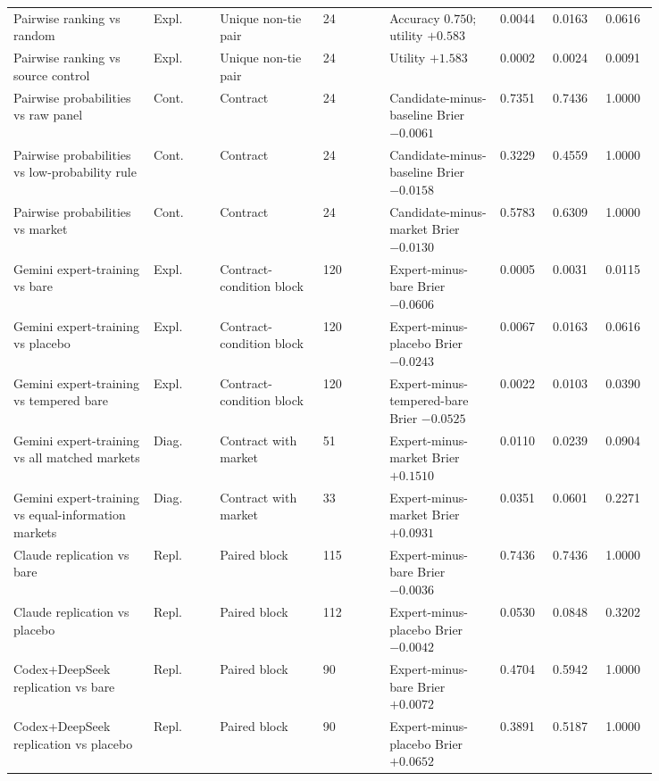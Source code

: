 \documentclass[11pt]{article}
\begin{document}
\begin{longtable}{@{}L{0.19\linewidth} L{0.09\linewidth} L{0.14\linewidth} L{0.09\linewidth} L{0.15\linewidth} L{0.06\linewidth} L{0.06\linewidth} L{0.06\linewidth}@{}}
Pairwise ranking vs random & Expl. & Unique non-tie pair & 24 & Accuracy \(0.750\); utility \(+0.583\) & 0.0044 & 0.0163 & 0.0616 \\
Pairwise ranking vs source control & Expl. & Unique non-tie pair & 24 & Utility \(+1.583\) & 0.0002 & 0.0024 & 0.0091 \\
Pairwise probabilities vs raw panel & Cont. & Contract & 24 & Candidate-minus-baseline Brier \(-0.0061\) & 0.7351 & 0.7436 & 1.0000 \\
Pairwise probabilities vs low-probability rule & Cont. & Contract & 24 & Candidate-minus-baseline Brier \(-0.0158\) & 0.3229 & 0.4559 & 1.0000 \\
Pairwise probabilities vs market & Cont. & Contract & 24 & Candidate-minus-market Brier \(-0.0130\) & 0.5783 & 0.6309 & 1.0000 \\
Gemini expert-training vs bare & Expl. & Contract-condition block & 120 & Expert-minus-bare Brier \(-0.0606\) & 0.0005 & 0.0031 & 0.0115 \\
Gemini expert-training vs placebo & Expl. & Contract-condition block & 120 & Expert-minus-placebo Brier \(-0.0243\) & 0.0067 & 0.0163 & 0.0616 \\
Gemini expert-training vs tempered bare & Expl. & Contract-condition block & 120 & Expert-minus-tempered-bare Brier \(-0.0525\) & 0.0022 & 0.0103 & 0.0390 \\
Gemini expert-training vs all matched markets & Diag. & Contract with market & 51 & Expert-minus-market Brier \(+0.1510\) & 0.0110 & 0.0239 & 0.0904 \\
Gemini expert-training vs equal-information markets & Diag. & Contract with market & 33 & Expert-minus-market Brier \(+0.0931\) & 0.0351 & 0.0601 & 0.2271 \\
Claude replication vs bare & Repl. & Paired block & 115 & Expert-minus-bare Brier \(-0.0036\) & 0.7436 & 0.7436 & 1.0000 \\
Claude replication vs placebo & Repl. & Paired block & 112 & Expert-minus-placebo Brier \(-0.0042\) & 0.0530 & 0.0848 & 0.3202 \\
Codex+DeepSeek replication vs bare & Repl. & Paired block & 90 & Expert-minus-bare Brier \(+0.0072\) & 0.4704 & 0.5942 & 1.0000 \\
Codex+DeepSeek replication vs placebo & Repl. & Paired block & 90 & Expert-minus-placebo Brier \(+0.0652\) & 0.3891 & 0.5187 & 1.0000 \\
\end{longtable}
\endgroup
\end{document}
